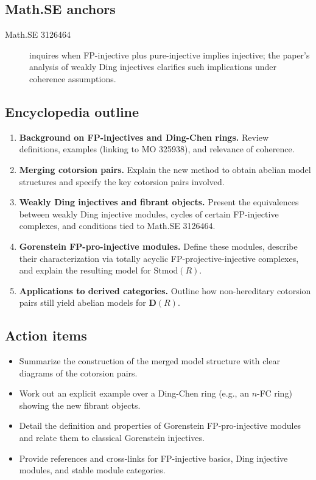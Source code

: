 \subsection*{Math.SE anchors}
\begin{description}
  \item[Math.SE 3126464] inquires when FP-injective plus pure-injective implies injective; the paper’s analysis of weakly Ding injectives clarifies such implications under coherence assumptions.
\end{description}
\subsection*{Encyclopedia outline}
\begin{enumerate}
  \item \textbf{Background on FP-injectives and Ding-Chen rings.} Review definitions, examples (linking to MO 325938), and relevance of coherence.
  \item \textbf{Merging cotorsion pairs.} Explain the new method to obtain abelian model structures and specify the key cotorsion pairs involved.
  \item \textbf{Weakly Ding injectives and fibrant objects.} Present the equivalences between weakly Ding injective modules, cycles of certain FP-injective complexes, and conditions tied to Math.SE 3126464.
  \item \textbf{Gorenstein FP-pro-injective modules.} Define these modules, describe their characterization via totally acyclic FP-projective-injective complexes, and explain the resulting model for $\mathrm{Stmod}(R)$.
  \item \textbf{Applications to derived categories.} Outline how non-hereditary cotorsion pairs still yield abelian models for $\mathbf{D}(R)$.
\end{enumerate}
\subsection*{Action items}
\begin{itemize}
  \item Summarize the construction of the merged model structure with clear diagrams of the cotorsion pairs.
  \item Work out an explicit example over a Ding-Chen ring (e.g., an $n$-FC ring) showing the new fibrant objects.
  \item Detail the definition and properties of Gorenstein FP-pro-injective modules and relate them to classical Gorenstein injectives.
  \item Provide references and cross-links for FP-injective basics, Ding injective modules, and stable module categories.
\end{itemize}
